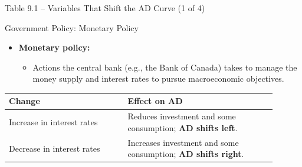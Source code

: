 \documentclass[aspectratio=169]{beamer}
\begin{document}
\begin{frame}{Table 9.1 -- Variables That Shift the AD Curve (1 of 4)}
\transfade
\begin{block}{Government Policy: Monetary Policy}
\end{block}
\begin{itemize}
  \item \textbf{Monetary policy:}
  \begin{itemize}
    \item Actions the central bank (e.g., the Bank of Canada) takes to manage the money supply and interest rates to pursue macroeconomic objectives.
  \end{itemize}
\end{itemize}
\begin{table}[h]
\centering
\begin{tabular}{p{0.4\linewidth} p{0.5\linewidth}}
\toprule
\textbf{Change} & \textbf{Effect on AD} \\
\midrule
Increase in interest rates & Reduces investment and some consumption; \textbf{AD shifts left}. \\
Decrease in interest rates & Increases investment and some consumption; \textbf{AD shifts right}. \\
\bottomrule
\end{tabular}
\end{table}
\end{frame}
\end{document}
